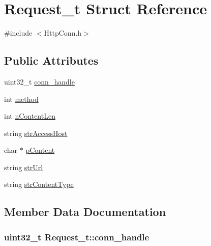 \hypertarget{struct_request__t}{}\section{Request\+\_\+t Struct Reference}
\label{struct_request__t}


{\ttfamily \#include $<$Http\+Conn.\+h$>$}

\subsection*{Public Attributes}
\begin{DoxyCompactItemize}
\item 
uint32\+\_\+t \hyperlink{struct_request__t_a65a1445a9fbb81fa43ffb0a285a2b9fb}{conn\+\_\+handle}
\item 
int \hyperlink{struct_request__t_a7bc28f4952030dd543bdfd532922419b}{method}
\item 
int \hyperlink{struct_request__t_a70316e29129116edda54be8f24a06e60}{n\+Content\+Len}
\item 
string \hyperlink{struct_request__t_a4b57a15dbb9d2b5e130a7edcb98d0c9d}{str\+Access\+Host}
\item 
char $\ast$ \hyperlink{struct_request__t_a85ab7493ada8befa9026616be85d3f30}{p\+Content}
\item 
string \hyperlink{struct_request__t_a92c6a0355cab06130f4cf1a497a6992b}{str\+Url}
\item 
string \hyperlink{struct_request__t_a20fe2bcb8d9dc932f14fc11192788e6e}{str\+Content\+Type}
\end{DoxyCompactItemize}


\subsection{Member Data Documentation}
\hypertarget{struct_request__t_a65a1445a9fbb81fa43ffb0a285a2b9fb}{}
\subsubsection[{conn\+\_\+handle}]{\setlength{\rightskip}{0pt plus 5cm}uint32\+\_\+t Request\+\_\+t\+::conn\+\_\+handle}\label{struct_request__t_a65a1445a9fbb81fa43ffb0a285a2b9fb}
\hypertarget{struct_request__t_a7bc28f4952030dd543bdfd532922419b}{}
